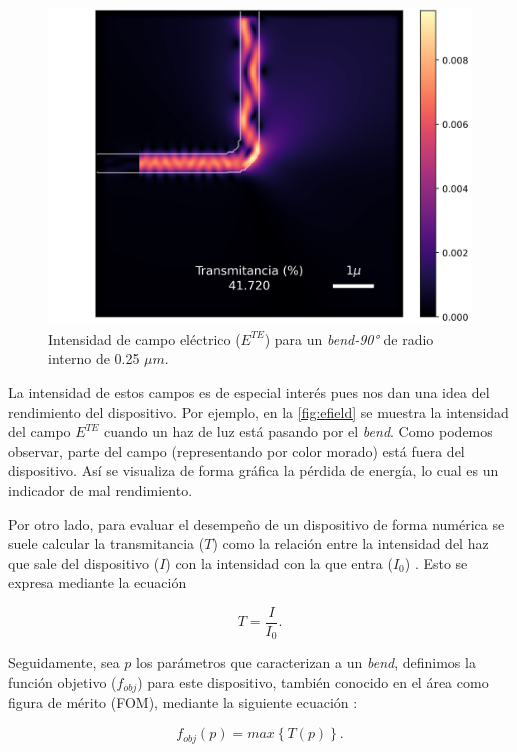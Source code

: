 \begin{figure}[ht]
  \centering
  \includegraphics[scale=0.7]{image/theory/bend-field.png}
  \caption{Intensidad de campo eléctrico ($E^{TE}$) para un \emph{bend-90°} de radio interno de 0.25 $\mu m$.}
  \label{fig:efield}
\end{figure}

La intensidad de estos campos es de especial interés pues nos dan una idea del rendimiento del dispositivo. 
Por ejemplo, en la \autoref{fig:efield} se muestra la intensidad del campo
$E^{TE}$ cuando un haz de luz está pasando por el \emph{bend}. 
Como podemos observar, parte del campo (representando por color morado) está
fuera del dispositivo.
Así se visualiza de forma gráfica la pérdida de energía, lo cual es un indicador de mal rendimiento.

Por otro lado, para evaluar el desempeño de un dispositivo de forma numérica se
suele calcular la transmitancia ($T$) como la relación entre la intensidad del haz
que sale del dispositivo ($I$) con la intensidad con la que entra ($I_0$) \citep{Su2020}. Esto se expresa mediante la ecuación

\begin{equation}
  T = \frac{I}{I_0}.
\label{eq:transmission}
\end{equation}

Seguidamente, sea $p$ los parámetros que caracterizan a un \emph{bend}, definimos la función objetivo ($f_{obj}$) para este dispositivo,
también conocido en el área como figura de mérito (FOM), mediante la siguiente ecuación
\citep{Su2020}:

\begin{equation}
  f_{obj}(p) = max \left \{ T(p) \right \}.
\label{eq:fom-bend}
\end{equation}


